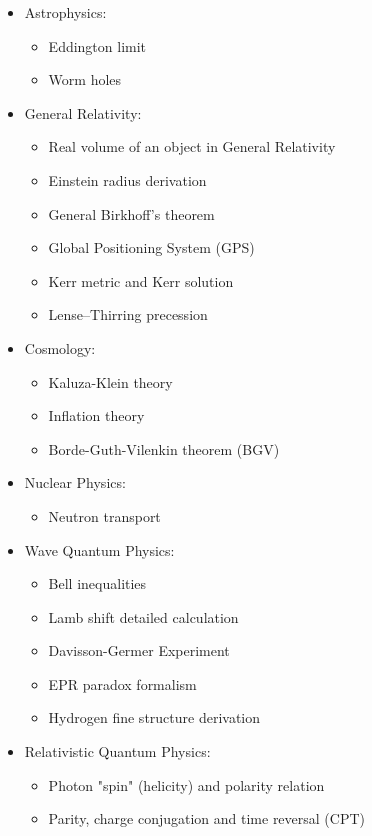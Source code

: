 \begin{itemize}
\begin{itemize}
			\end{itemize}
		\item Astrophysics:
			\begin{itemize}	
				\item Eddington limit
				\item Worm holes
			\end{itemize}		
		\item General Relativity:
			\begin{itemize}
				\item Real volume of an object in General Relativity
				\item Einstein radius derivation
				\item General Birkhoff's theorem
				\item Global Positioning System (GPS)
				\item Kerr metric and Kerr solution
				\item Lense–Thirring precession	
			\end{itemize}
		\item Cosmology:
			\begin{itemize}
				\item Kaluza-Klein theory
				\item Inflation theory
				\item Borde-Guth-Vilenkin theorem (BGV)
			\end{itemize}
		\item Nuclear Physics:
			\begin{itemize}
				\item Neutron transport
			\end{itemize}
		\item Wave Quantum Physics:
			\begin{itemize}
				\item Bell inequalities
				\item Lamb shift detailed calculation
				\item Davisson-Germer Experiment
				\item EPR paradox formalism
				\item Hydrogen fine structure derivation
			\end{itemize}
		\item Relativistic Quantum Physics:
			\begin{itemize}
				\item Photon "spin" (helicity) and polarity relation
				\item Parity, charge conjugation and time reversal (CPT)
			\end{itemize}

\end{itemize}
